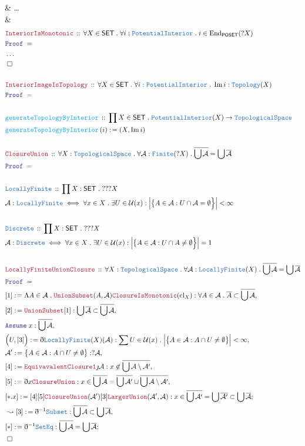 \documentclass[12pt]{scrartcl}
\newcommand{\TYPE}[1]{\textcolor{NavyBlue}{\mathtt{#1}}}
\newcommand{\FUNC}[1]{\textcolor{Cerulean}{\mathtt{#1}}}
\newcommand{\LOGIC}[1]{\textcolor{Blue}{\mathtt{#1}}}
\newcommand{\THM}[1]{\textcolor{Maroon}{\mathtt{#1}}}
\renewcommand{\.}{\; . \;}
\newcommand{\de}{: \kern 0.1pc =}
\newcommand{\Act}[1]{\left( #1 \right)}
\newcommand{\Theorem}[2]{& \THM{#1} \, :: \, #2 \\ & \Proof = \\ }
\newcommand{\DeclareType}[2]{& \TYPE{#1} \, :: \, #2 \\}
\newcommand{\DefineType}[3]{& #1 : \TYPE{#2} \iff #3 \\}
\newcommand{\DeclareFunc}[2]{& \FUNC{#1} \, :: \, #2 \\}
\newcommand{\DefineFunc}[3]{&  \FUNC{#1}\Act{#2} \de #3 \\}
\newcommand{\Page}[1]{ \begin{align*} #1 \end{align*}   }
\newcommand{ \bd }{ \ByDef }
\newcommand{\NoProof}{ & \ldots \\ \EndProof}
\DeclareMathOperator*{\im}{Im}
\newcommand{\End}{\mathrm{End}}
\newcommand{\Say}[3]{& #1 \de #2 : #3, \\}
\newcommand{\Conclude}[3]{& #1 \de #2 : #3; \\}
\newcommand{\Derive}[3]{& \leadsto #1 \de #2 : #3, \\}
\newcommand{\Assume}[2]{& \LOGIC{Assume} \; #1 : #2, \\}
\newcommand{\QED}{\; \square}
\newcommand{\EndProof}{& \QED \\}
\newcommand{\ByDef}{\eth}
\newcommand{\ByConstr}{\jmath}
\newcommand{\Proof}{\LOGIC{Proof} \; }
\newcommand{\A}{\mathcal{A}}
\newcommand{\SET}{\mathsf{SET}}
\newcommand{\TS}{\TYPE{TopologicalSpace}}
\newcommand{\LF}{\TYPE{LocallyFinite}}
\DeclareMathOperator*{\cl}{cl}
\newcommand{\U}{\mathcal{U}}
\begin{document}
{{	}
	\NoProof
}\Page{
	\Theorem{InteriorIsMonotonic}{
		\forall X \in \SET \.
		\forall i : \TYPE{PotentialInterior} \.
		i \in \End_{\mathsf{POSET}}(?X)
	}
	\NoProof
	\\
	\Theorem{InteriorImageIsTopology}
	{
		\forall X \in \SET \.
		\forall i : \TYPE{PotentialInterior} \.
		\im i : \TYPE{Topology}(X)
	}
	\\
	\DeclareFunc{generateTopologyByInterior}
	{
		\prod X \in \SET \. 
		\TYPE{PotentialInterior}(X)
		\to \TS
	}
	\DefineFunc{generateTopologyByInterior}{i}
	{
		(X, \im i)
	}
	\\
	\Theorem{ClosureUnion}
	{
		\forall X : \TS \. 
		\forall \A : \TYPE{Finite}(?X) \.
		\overline{\bigcup \A} = \bigcup \overline{\A}
	}
	\\
	\DeclareType{LocallyFinite}
	{
		\prod X : \SET \. ???X
	}
	\DefineType{\A}{LocallyFinite}
	{
		\forall x \in X \. \exists U \in \U(x) :
		\Big|\big\{ A \in \A : U \cap \A = \emptyset  \Big\}\Big| < \infty 
	} 
	\\
	\DeclareType{Discrete}
	{
		\prod X : \SET \. ???X
	}
	\DefineType{\A}{Discrete}
	{
		\forall x \in X \. \exists U \in \U(x) : 
		\Big|\big\{ A \in \A : U \cap A \neq \emptyset  \Big\}\Big| = 1
	}
	\\
	\Theorem{LocallyFiniteUnionClosure}
	{
		\forall X : \TS \.
		\forall \A : \TYPE{LocallyFinite}(X) \.
		\overline{\bigcup \A} = \bigcup \overline{\A} 
	}
	\Say{[1]}{
		\Lambda A \in \A \. 
		\THM{UnionSubset}(A,\A)
		\THM{ClosureIsMonotonic}({\cl}_X)}
	{
		\forall A \in \A \. \overline{A} \subset \overline{\bigcup \A}
	}
	\Say{[2]}{ \THM{UnionSubset}[1] }
	{
		 \bigcup \overline{\A} \subset \overline{\bigcup \A} 
	}
	\Assume{x}{\overline{\bigcup \A}}
	\Say{ \Big( U, [3]\Big)}{\bd \LF(X)(\A)}
	{
		 \sum U \in \U(x) \. 
		\Big| \big\{ A \in \A :  A \cap U \neq \emptyset  \big\}\Big|  < \infty
	}
	\Say{\A'}{\big\{ A \in \A : A \cap U \neq \emptyset  \big\}}
	{ ?\A  }
	\Say{[4]}{\THM{EquivavalentClosure1}\ByConstr \A}
	{
		x \not\in \overline{\bigcup \A \setminus \A' }
	}
	\Say{[5]}{\bd x  \THM{ClosureUnion}}
	{ 
		x \in \overline{\bigcup \A} = 
		\overline{\bigcup \A'} \cup \overline{\bigcup \A \setminus \A'}
	}
	\Conclude{[*.x]}{[4][5] \THM{ClosureUnion}(\A')[3] \THM{LargerUnion}(\A',\A)  }
	{
		x \in \overline{\bigcup \A'} =
		\bigcup \overline{\A'} \subset \bigcup \overline{\A}
	}
	\Derive{[3]}{\bd^{-1}\TYPE{Subset}}
	{
		\overline{\bigcup \A} \subset \bigcup \overline{\A}
	}
	\Conclude{[*]}{\bd^{-1}\TYPE{SetEq}}
	{
		\overline{\bigcup \A} = \bigcup \overline{\A}
	}
	\EndProof
	\\
}
\end{document}
